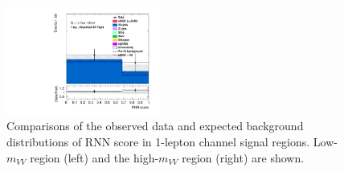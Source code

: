 \begin{figure}[]
    \includegraphics[width=0.45\textwidth]{figures/aQGC/PostFit/Region_distRNN_DSRVBSTightHMlvjj1500_BMin0_T0_Y6051_incTag1_J2_L1_incJet1_GlobalFit_unconditionnal_mu1log}
      \caption{Comparisons of the observed data and expected background distributions of RNN score in 1-lepton channel signal regions. Low-$m_{VV}$ region (left) and the high-$m_{VV}$ region (right) are shown.}
      \label{fig:postSR1lepaQGC}
\end{figure}
